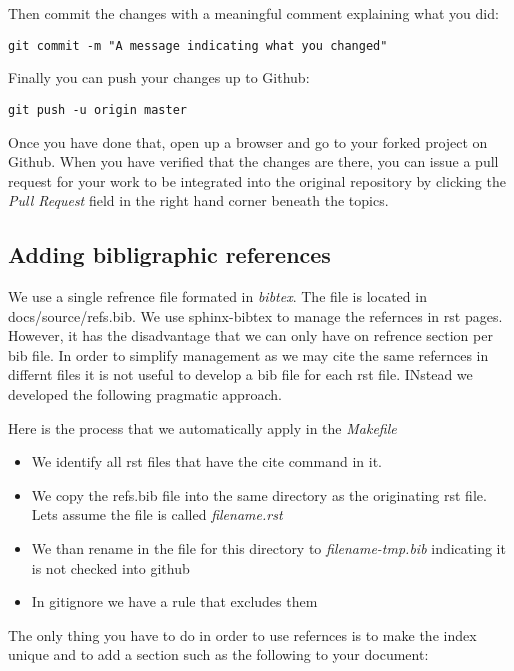 Then commit the changes with a meaningful comment explaining what you
did:

\begin{verbatim}
git commit -m "A message indicating what you changed"
\end{verbatim}

Finally you can push your changes up to Github:

\begin{verbatim}
git push -u origin master
\end{verbatim}

Once you have done that, open up a browser and go to your forked project
on Github. When you have verified that the changes are there, you can
issue a pull request for your work to be integrated into the original
repository by clicking the \emph{Pull Request} field in the right hand
corner beneath the topics.

\subsection{Adding bibligraphic
references}\label{adding-bibligraphic-references}

We use a single refrence file formated in \emph{bibtex}. The file is
located in docs/source/refs.bib. We use sphinx-bibtex to manage the
refernces in rst pages. However, it has the disadvantage that we can
only have on refrence section per bib file. In order to simplify
management as we may cite the same refernces in differnt files it is not
useful to develop a bib file for each rst file. INstead we developed the
following pragmatic approach.

Here is the process that we automatically apply in the \emph{Makefile}

\begin{itemize}
\tightlist
\item
  We identify all rst files that have the cite command in it.
\item
  We copy the refs.bib file into the same directory as the originating
  rst file. Lets assume the file is called \emph{filename.rst}
\item
  We than rename in the file for this directory to
  \emph{filename-tmp.bib} indicating it is not checked into github
\item
  In gitignore we have a rule that excludes them
\end{itemize}

The only thing you have to do in order to use refernces is to make the
index unique and to add a section such as the following to your
document:


